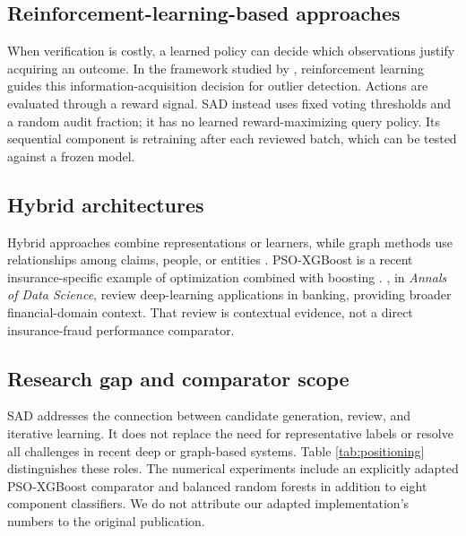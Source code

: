 \begin{revised}
\subsection{Reinforcement-learning-based approaches}
When verification is costly, a learned policy can decide which observations
justify acquiring an outcome. In the framework studied by \citet{A73},
reinforcement learning guides this information-acquisition decision for
outlier detection. Actions are evaluated through a reward signal. SAD instead uses fixed voting
thresholds and a random audit fraction; it has no learned reward-maximizing
query policy. Its sequential component is retraining after each reviewed
batch, which can be tested against a frozen model.

\subsection{Hybrid architectures}
Hybrid approaches combine representations or learners, while graph methods
use relationships among claims, people, or entities \citep{Vorobyev2024}.
PSO-XGBoost is a recent insurance-specific example of optimization combined
with boosting \citep{Ding2025}. \citet{Hassani2020}, in \emph{Annals of Data
Science}, review deep-learning applications in banking, providing broader
financial-domain context. That review is contextual evidence, not a direct
insurance-fraud performance comparator.

\subsection{Research gap and comparator scope}
SAD addresses the connection between candidate generation, review, and
iterative learning. It does not replace the need for representative labels
or resolve all challenges in recent deep or graph-based systems.
Table \ref{tab:positioning} distinguishes these roles. The numerical
experiments include an explicitly adapted PSO-XGBoost comparator and balanced
random forests in addition to eight component classifiers. We do not
attribute our adapted implementation's numbers to the original publication.


\end{revised}
